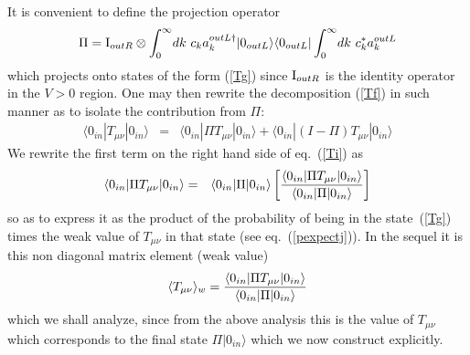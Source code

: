 \documentclass[12pt,oneside]{report}
\def\ket#1{|#1\rangle}
\def\bra#1{\langle #1|}
\begin{document}
It is convenient to define the projection
operator  \begin{equation}
\Pi = {\rm I}_{out R} \otimes \int_0^\infty \! dk\
c_k a_k^{out L \dagger} \ket{0_{out L}}\bra{0_{out L}}
\int_0^\infty \! dk\
c_k^* a_k^{out  L}
\label{Th}
\end{equation}
which projects onto states of the form (\ref{Tg}) since ${\rm I}_{out R}$ is
the identity operator in the $V>0$ region.  One may then rewrite the
decomposition (\ref{Tf}) in such manner as to isolate the contribution from
$\Pi$: \begin{eqnarray}
\bra{0_{in}}  T_{\mu\nu} \ket{0_{in}} &=&   
\bra{0_{in}} \Pi T_{\mu\nu} \ket{0_{in}}
+ \bra{0_{in}} (I -\Pi) T_{\mu\nu} \ket{0_{in}} 
\label{Ti}
\end{eqnarray}
We rewrite the first term on the right hand side of eq.~(\ref{Ti})
as
\begin{eqnarray}
\bra{0_{in}} \Pi T_{\mu\nu} \ket{0_{in}} &=&   
\bra{0_{in}} \Pi  \ket{0_{in}}
\left[ { \bra{0_{in}} \Pi T_{\mu\nu} \ket{0_{in}} \over  
\bra{0_{in}} \Pi  \ket{0_{in}} }\right]
\label{Tj}
\end{eqnarray}
so as to express it as the product of the probability of
being in the state~(\ref{Tg}) times the weak value of $
T_{\mu\nu}$ in that state (see eq.~(\ref{pexpectj})).
In the sequel it is this non diagonal matrix element (weak value) 
\begin{equation}
\langle T_{\mu\nu} \rangle_w ={ \bra{0_{in}} \Pi T_{\mu\nu}
\ket{0_{in}} \over   \bra{0_{in}} \Pi  \ket{0_{in}} }
\label{Tk}
\end{equation}
which we shall analyze,
since from the above analysis this is the value of 
$T_{\mu\nu}$ which corresponds to the final state $\Pi \ket{0_{in}}$
which we now construct explicitly.
\end{document}
